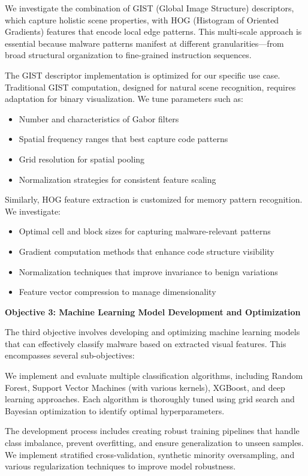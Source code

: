 We investigate the combination of GIST (Global Image Structure) descriptors, which capture holistic scene properties, with HOG (Histogram of Oriented Gradients) features that encode local edge patterns. This multi-scale approach is essential because malware patterns manifest at different granularities—from broad structural organization to fine-grained instruction sequences.

The GIST descriptor implementation is optimized for our specific use case. Traditional GIST computation, designed for natural scene recognition, requires adaptation for binary visualization. We tune parameters such as:
\begin{itemize}
\item Number and characteristics of Gabor filters
\item Spatial frequency ranges that best capture code patterns
\item Grid resolution for spatial pooling
\item Normalization strategies for consistent feature scaling
\end{itemize}

Similarly, HOG feature extraction is customized for memory pattern recognition. We investigate:
\begin{itemize}
\item Optimal cell and block sizes for capturing malware-relevant patterns
\item Gradient computation methods that enhance code structure visibility
\item Normalization techniques that improve invariance to benign variations
\item Feature vector compression to manage dimensionality
\end{itemize}

\textbf{Objective 3: Machine Learning Model Development and Optimization}

The third objective involves developing and optimizing machine learning models that can effectively classify malware based on extracted visual features. This encompasses several sub-objectives:

We implement and evaluate multiple classification algorithms, including Random Forest, Support Vector Machines (with various kernels), XGBoost, and deep learning approaches. Each algorithm is thoroughly tuned using grid search and Bayesian optimization to identify optimal hyperparameters.

The development process includes creating robust training pipelines that handle class imbalance, prevent overfitting, and ensure generalization to unseen samples. We implement stratified cross-validation, synthetic minority oversampling, and various regularization techniques to improve model robustness.

